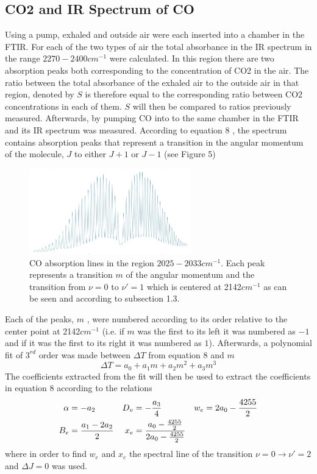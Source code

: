 \documentclass[reprint,amsmath,amssymb,aps, prl]{revtex4-2}
\begin{document}
\subsection{CO2 and IR Spectrum of CO}
Using a pump, exhaled and outside air were each inserted into a chamber in the FTIR. For each of the two types of air the total absorbance in the IR spectrum in the range $2270-2400cm^{-1}$ were calculated. In this region there are two absorption peaks both corresponding to the concentration of CO2 in the air. The ratio between the total absorbance of the exhaled air to the outside air in that region, denoted by $S$ is therefore equal to the corresponding ratio between CO2 concentrations in each of them. $S$ will then be compared to ratios previously measured. 
Afterwards, by pumping CO into to the same chamber in the FTIR and its IR spectrum was measured.  According to equation 8 ,  the spectrum contains absorption peaks that represent a transition in the angular momentum of the molecule, $J$  to either $J+1$ or $J-1$ (see Figure 5)  
\begin{figure}[h]
    \includegraphics[width=7cm]{Images/COEnergystates.jpg}
    \caption{CO absorption lines in the region $2025-2033 cm^{-1}$. Each peak represents a transition $m$ of the angular momentum and the transition from $\nu=0$ to $\nu'=1$ which is centered at 2142$cm^{-1}$  as can be seen and according to subsection 1.3.}
    \label{fig:CoEnergy}
    \centering
\end{figure}
Each of the peaks, $m$ , were numbered according to its order relative to the center point at 2142$cm^{-1}$ (i.e. if $m$ was the first to its left it was numbered as $-1$ and if it was the first to its right it was numbered as $1$). Afterwards, a polynomial fit of $3^{rd}$ order was made between $\Delta T$ from equation 8 and $m$
\begin{equation} \label{eq:CO_EnrgStatesFit}
    \Delta T = a_{0}+a_{1}m+a_{2}m^2+a_{3}m^3
\end{equation}
The coefficients extracted from the fit will then be used to extract the coefficients in equation 8 according to the relations 
\begin{equation}
\begin{aligned}
\alpha &=-a_{2} & D_{v}&=-\frac{a_{3}}{4} & w_{e}&=2a_{0}-\frac{4255}{2} \\
B_{e}&=\frac{a_{1}-2a_{2}}{2} &  x_{e}&=\frac{a_{0}-\frac{4255}{2}}{2a_{0}-\frac{4255}{2}}
\end{aligned}
\label{eq:COFITcoefficients}
\centering
\end{equation}
where in order to find $w_{e}$ and $x_{e}$ the spectral line of the transition $\nu =0 \rightarrow \nu'=2$ and $\Delta J =0$ was used. 
\end{document}

